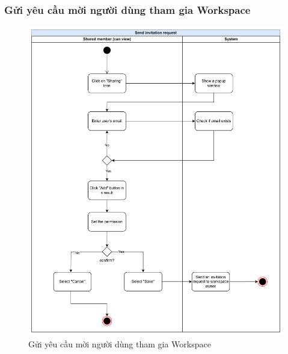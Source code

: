 \subsubsection{Gửi yêu cầu mời người dùng tham gia Workspace}
    \begin{figure}[H]
        \centering
        \includegraphics[width=\linewidth]{Content/Phân tích và thiết kế hệ thống/documents/Sơ đồ hoạt động/images/sendInvitationRequest.png}
        \vspace{0.5cm}
        \caption{Gửi yêu cầu mời người dùng tham gia Workspace}
        \label{fig:Gửi yêu cầu mời người dùng tham gia Workspace}
    \end{figure}